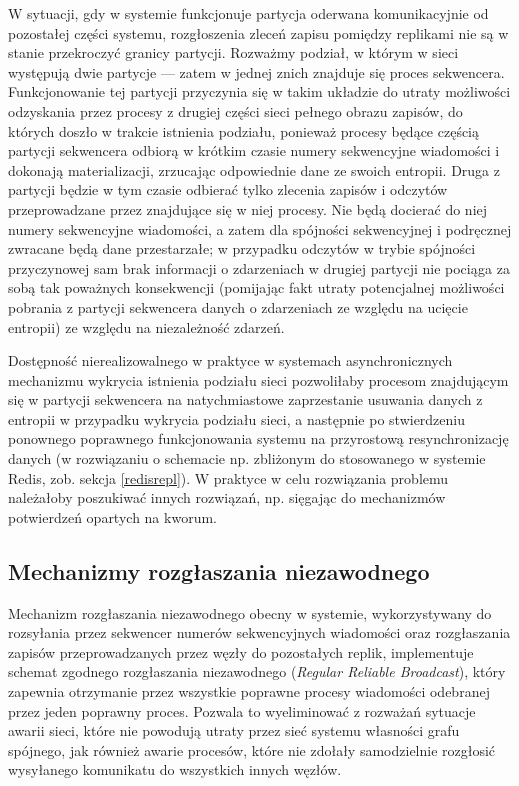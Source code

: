 W sytuacji, gdy w systemie funkcjonuje partycja oderwana komunikacyjnie od pozostałej części systemu, rozgłoszenia zleceń zapisu pomiędzy replikami nie są w stanie przekroczyć granicy partycji. Rozważmy podział, w którym w sieci występują dwie partycje --- zatem w jednej znich znajduje się proces sekwencera. Funkcjonowanie tej partycji przyczynia się w takim układzie do utraty możliwości odzyskania przez procesy z drugiej części sieci pełnego obrazu zapisów, do których doszło w trakcie istnienia podziału, ponieważ procesy będące częścią partycji sekwencera odbiorą w krótkim czasie numery sekwencyjne wiadomości i dokonają materializacji, zrzucając odpowiednie dane ze swoich entropii. Druga z partycji będzie w tym czasie odbierać tylko zlecenia zapisów i odczytów przeprowadzane przez znajdujące się w niej procesy. Nie będą docierać do niej numery sekwencyjne wiadomości, a zatem dla spójności sekwencyjnej i podręcznej zwracane będą dane przestarzałe; w przypadku odczytów w trybie spójności przyczynowej sam brak informacji o zdarzeniach w drugiej partycji nie pociąga za sobą tak poważnych konsekwencji (pomijając fakt utraty potencjalnej możliwości pobrania z partycji sekwencera danych o zdarzeniach ze względu na ucięcie entropii) ze względu na niezależność zdarzeń.

Dostępność nierealizowalnego w praktyce w systemach asynchronicznych mechanizmu wykrycia istnienia podziału sieci pozwoliłaby procesom znajdującym się w partycji sekwencera na natychmiastowe zaprzestanie usuwania danych z entropii w przypadku wykrycia podziału sieci, a następnie po stwierdzeniu ponownego poprawnego funkcjonowania systemu na przyrostową resynchronizację danych (w rozwiązaniu o schemacie np. zbliżonym do stosowanego w systemie Redis, zob. sekcja \ref{redisrepl}). W praktyce w celu rozwiązania problemu należałoby poszukiwać innych rozwiązań, np. sięgając do mechanizmów potwierdzeń opartych na kworum.

\subsection{Mechanizmy rozgłaszania niezawodnego} \label{subsection:reliablebroadcast}

Mechanizm rozgłaszania niezawodnego obecny w systemie, wykorzystywany do rozsyłania przez sekwencer numerów sekwencyjnych wiadomości oraz rozgłaszania zapisów przeprowadzanych przez węzły do pozostałych replik, implementuje schemat zgodnego rozgłaszania niezawodnego (\textit{Regular Reliable Broadcast}), który zapewnia otrzymanie przez wszystkie poprawne procesy wiadomości odebranej przez jeden poprawny proces. Pozwala to wyeliminować z rozważań sytuacje awarii sieci, które nie powodują utraty przez sieć systemu własności grafu spójnego, jak również awarie procesów, które nie zdołały samodzielnie rozgłosić wysyłanego komunikatu do wszystkich innych węzłów.

